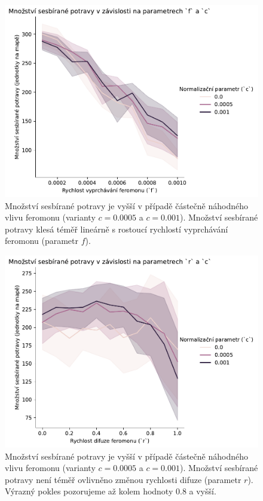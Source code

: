 \documentclass[10pt,a4paper,twocolumn]{article}
\begin{document}
\begin{figure}[tb]
  \centering
  \includegraphics[width=0.9\linewidth]{images/grid_search_1_fade.pdf}
  \caption{Množství sesbírané potravy je vyšší v případě částečně náhodného
  vlivu feromonu (varianty $c=0.0005$ a $c=0.001$). Množství sesbírané 
  potravy klesá téměř lineárně s rostoucí rychlostí vyprchávání feromonu 
  (parametr $f$).}
  \label{fig:grid_search_1_fade}
\end{figure}


\begin{figure}[tb]
  \centering
  \includegraphics[width=0.9\linewidth]{images/grid_search_1_difusion.pdf}
  \caption{Množství sesbírané potravy je vyšší v případě částečně náhodného
  vlivu feromonu (varianty $c=0.0005$ a $c=0.001$). Množství sesbírané 
  potravy není téměř ovlivněno změnou rychlosti difuze (parametr $r$). 
  Výrazný pokles pozorujeme až kolem hodnoty $0.8$ a vyšší.}
  \label{fig:grid_search_1_difusion}
\end{figure}
\end{document}
